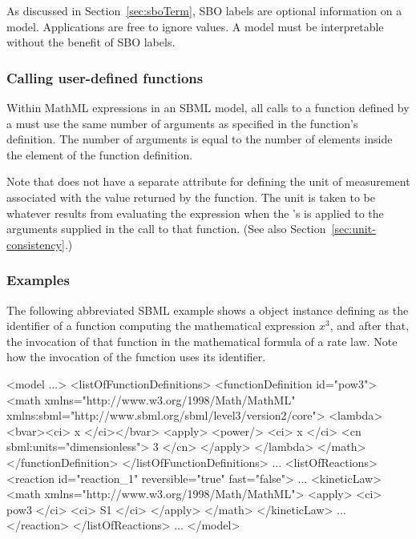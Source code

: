 As discussed in Section~\ref{sec:sboTerm}, SBO labels are optional
information on a model.  Applications are free to ignore
 values.  A model must be interpretable without the
benefit of SBO labels.


\subsubsection{Calling user-defined functions}
\label{sec:functiondefinition-calling}

Within MathML expressions in an SBML model, all calls to a
function defined by a \FunctionDefinition must use the same number
of arguments as specified in the function's definition.  The
number of arguments is equal to the number of 
elements inside the  element of the function
definition.

Note that \FunctionDefinition does not have a separate attribute
for defining the unit of measurement associated with the value
returned by the function.  The unit is taken to be whatever
results from evaluating the expression when the
\FunctionDefinition's  is applied to the arguments
supplied in the call to that function.  (See also
Section~\ref{sec:unit-consistency}.)


\subsubsection{Examples}

The following abbreviated SBML example shows a \FunctionDefinition
object instance defining  as the identifier of a function
computing the mathematical expression $x^{3}$, and after that, the
invocation of that function in the mathematical formula of a rate
law.  Note how the invocation of the function uses its identifier.

\begin{example}
<model ...>
   <listOfFunctionDefinitions>
       <functionDefinition id="pow3">
           <math xmlns="http://www.w3.org/1998/Math/MathML"
                 xmlns:sbml="http://www.sbml.org/sbml/level3/version2/core">
               <lambda>
                   <bvar><ci> x </ci></bvar>
                   <apply> <power/> <ci> x </ci> <cn sbml:units="dimensionless"> 3 </cn> </apply>
               </lambda>
           </math>
       </functionDefinition>
   </listOfFunctionDefinitions>
   ...
   <listOfReactions>
       <reaction id="reaction_1" reversible="true" fast="false">
           ...
           <kineticLaw>
               <math xmlns="http://www.w3.org/1998/Math/MathML">
                   <apply> <ci> pow3 </ci> <ci> S1 </ci> </apply>
               </math>
           </kineticLaw>
           ...
       </reaction>
   </listOfReactions>
   ...
</model>\end{example}


